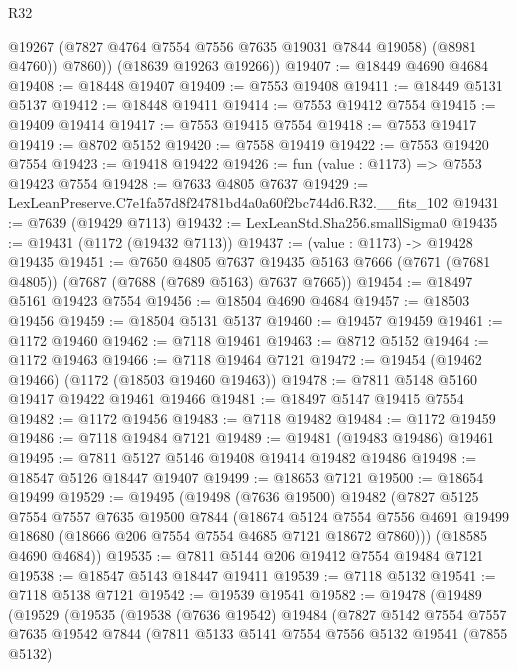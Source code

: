 \begin{lexlean}{R32}
\begin{coremodule}
            @19267
            (@7827 @4764 @7554 @7556 @7635 @19031 @7844 @19058)
            (@8981 @4760))
          @7860))
      (@18639 @19263 @19266))
@19407 := @18449 @4690 @4684
@19408 := @18448 @19407
@19409 := @7553 @19408
@19411 := @18449 @5131 @5137
@19412 := @18448 @19411
@19414 := @7553 @19412 @7554
@19415 := @19409 @19414
@19417 := @7553 @19415 @7554
@19418 := @7553 @19417
@19419 := @8702 @5152
@19420 := @7558 @19419
@19422 := @7553 @19420 @7554
@19423 := @19418 @19422
@19426 := fun (value : @1173) => @7553 @19423 @7554
@19428 := @7633 @4805 @7637
@19429 := LexLeanPreserve.C7e1fa57d8f24781bd4a0a60f2bc744d6.R32.__fits_102
@19431 := @7639 (@19429 @7113)
@19432 := LexLeanStd.Sha256.smallSigma0
@19435 := @19431 (@1172 (@19432 @7113))
@19437 := (value : @1173) -> @19428 @19435
@19451 := @7650
    @4805
    @7637
    @19435
    @5163
    @7666
    (@7671 (@7681 @4805))
    (@7687 (@7688 (@7689 @5163) @7637 @7665))
@19454 := @18497 @5161 @19423 @7554
@19456 := @18504 @4690 @4684
@19457 := @18503 @19456
@19459 := @18504 @5131 @5137
@19460 := @19457 @19459
@19461 := @1172 @19460
@19462 := @7118 @19461
@19463 := @8712 @5152
@19464 := @1172 @19463
@19466 := @7118 @19464 @7121
@19472 := @19454 (@19462 @19466) (@1172 (@18503 @19460 @19463))
@19478 := @7811 @5148 @5160 @19417 @19422 @19461 @19466
@19481 := @18497 @5147 @19415 @7554
@19482 := @1172 @19456
@19483 := @7118 @19482
@19484 := @1172 @19459
@19486 := @7118 @19484 @7121
@19489 := @19481 (@19483 @19486) @19461
@19495 := @7811 @5127 @5146 @19408 @19414 @19482 @19486
@19498 := @18547 @5126 @18447 @19407
@19499 := @18653 @7121
@19500 := @18654 @19499
@19529 := @19495
    (@19498
      (@7636 @19500)
      @19482
      (@7827
        @5125
        @7554
        @7557
        @7635
        @19500
        @7844
        (@18674
          @5124
          @7554
          @7556
          @4691
          @19499
          @18680
          (@18666 @206 @7554 @7554 @4685 @7121 @18672 @7860)))
      (@18585 @4690 @4684))
@19535 := @7811 @5144 @206 @19412 @7554 @19484 @7121
@19538 := @18547 @5143 @18447 @19411
@19539 := @7118 @5132
@19541 := @7118 @5138 @7121
@19542 := @19539 @19541
@19582 := @19478
    (@19489
      (@19529
        (@19535
          (@19538
            (@7636 @19542)
            @19484
            (@7827
              @5142
              @7554
              @7557
              @7635
              @19542
              @7844
              (@7811
                @5133
                @5141
                @7554
                @7556
                @5132
                @19541
                (@7855 @5132)

\end{coremodule}
\end{lexlean}
